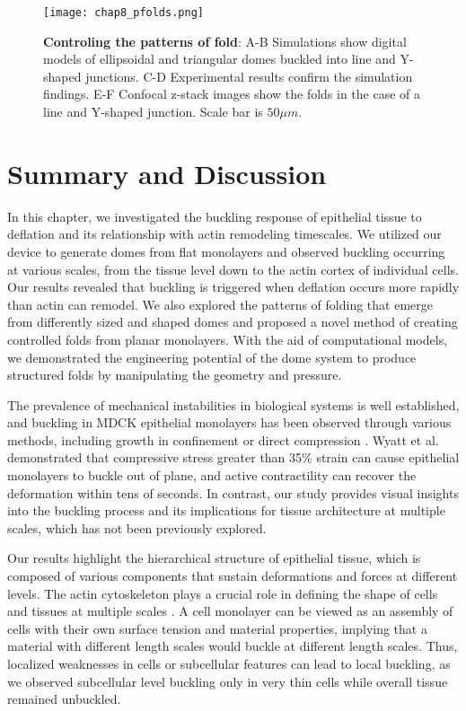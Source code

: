 \begin{figure}
	\centering
	\texttt{[image: chap8\_pfolds.png]}
	\caption{\label{fig_8_7} \textbf{Controling the patterns of fold}: A-B Simulations show digital models of ellipsoidal and triangular domes buckled into line and Y-shaped junctions. C-D Experimental results confirm the simulation findings. E-F Confocal z-stack images show the folds in the case of a line and Y-shaped junction. Scale bar is $50\mu m$.	}
\end{figure}


\newpage

\hypertarget{summary-and-discussion-1}{%
	\section{Summary and Discussion}\label{summary-and-discussion-1}}

In this chapter, we investigated the buckling response of epithelial tissue to deflation and its relationship with actin remodeling timescales. We utilized our device to generate domes from flat monolayers and observed buckling occurring at various scales, from the tissue level down to the actin cortex of individual cells. Our results revealed that buckling is triggered when deflation occurs more rapidly than actin can remodel. We also explored the patterns of folding that emerge from differently sized and shaped domes and proposed a novel method of creating controlled folds from planar monolayers. With the aid of computational models, we demonstrated the engineering potential of the dome system to produce structured folds by manipulating the geometry and pressure.

The prevalence of mechanical instabilities in biological systems is well established, and buckling in MDCK epithelial monolayers has been observed through various methods, including growth in confinement or direct compression \cite{wyatt2020,trushko2020}. Wyatt et al. demonstrated that compressive stress greater than 35\% strain can cause epithelial monolayers to buckle out of plane, and active contractility can recover the deformation within tens of seconds. In contrast, our study provides visual insights into the buckling process and its implications for tissue architecture at multiple scales, which has not been previously explored.

Our results highlight the hierarchical structure of epithelial tissue, which is composed of various components that sustain deformations and forces at different levels. The actin cytoskeleton plays a crucial role in defining the shape of cells and tissues at multiple scales \cite{clarke2021}. A cell monolayer can be viewed as an assembly of cells with their own surface tension and material properties, implying that a material with different length scales would buckle at different length scales. Thus, localized weaknesses in cells or subcellular features can lead to local buckling, as we observed subcellular level buckling only in very thin cells while overall tissue remained unbuckled.

